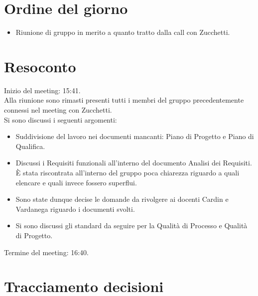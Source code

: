 \section{Ordine del giorno}

\begin{itemize}
	\item Riunione di gruppo in merito a quanto tratto dalla call con Zucchetti.
\end{itemize}

\section{Resoconto}
\label{sec:Resoconto}

\noindent 
Inizio del meeting: 15:41. \\
\noindent Alla riunione sono rimasti presenti tutti i membri del gruppo precedentemente connessi nel meeting con Zucchetti. \\
Si sono discussi i seguenti argomenti:
\begin{itemize}
	\item Suddivisione del lavoro nei documenti mancanti: Piano di Progetto e Piano di Qualifica.
	\item Discussi i Requisiti funzionali all'interno del documento Analisi dei Requisiti. È stata riscontrata all'interno del gruppo poca chiarezza riguardo a quali elencare e quali invece fossero superflui.
	\item Sono state dunque decise le domande da rivolgere ai docenti Cardin e Vardanega riguardo i documenti svolti.
	\item Si sono discussi gli standard da seguire per la Qualità di Processo e Qualità di Progetto.
\end{itemize}

\noindent Termine del meeting: 16:40.


\section{Tracciamento decisioni}

